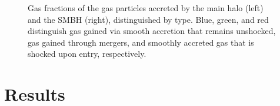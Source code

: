 \documentclass[]{emulateapj}
\begin{document}
\begin{figure}
\centerline{}
\caption[]{Gas fractions of the gas particles accreted by the main halo (left) and the SMBH (right), distinguished by type. Blue, green, and red distinguish gas gained via smooth accretion that remains unshocked, gas gained through mergers, and smoothly accreted gas that is shocked upon entry, respectively.}
\label{hrh258stackfrac}
\end{figure}



\section{Results} \label{results}

\end{document}
